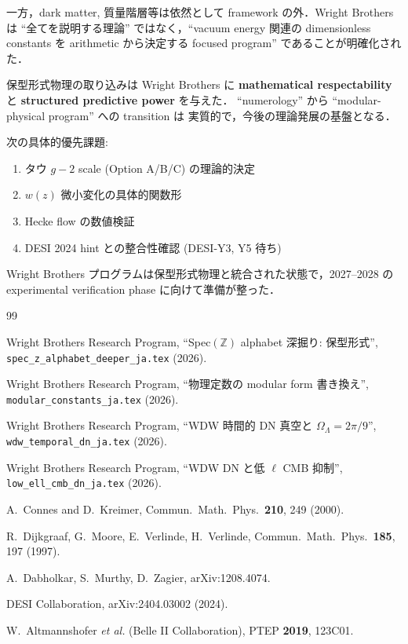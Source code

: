 \documentclass[11pt,a4paper]{article}
\begin{document}
一方，dark matter, 質量階層等は依然として framework の外．Wright
Brothers は ``全てを説明する理論'' ではなく，``vacuum energy 関連の
dimensionless constants を arithmetic から決定する focused program''
であることが明確化された．

保型形式物理の取り込みは Wright Brothers に \textbf{mathematical
respectability} と \textbf{structured predictive power} を与えた．
``numerology'' から ``modular-physical program'' への transition は
実質的で，今後の理論発展の基盤となる．

次の具体的優先課題:
\begin{enumerate}
\item タウ $g-2$ scale (Option A/B/C) の理論的決定
\item $w(z)$ 微小変化の具体的関数形
\item Hecke flow の数値検証
\item DESI 2024 hint との整合性確認 (DESI-Y3, Y5 待ち)
\end{enumerate}

Wright Brothers プログラムは保型形式物理と統合された状態で，2027--2028
の experimental verification phase に向けて準備が整った．

\begin{thebibliography}{99}

Wright Brothers Research Program,
``Spec$(\mathbb{Z})$ alphabet 深掘り: 保型形式'',
\texttt{spec\_z\_alphabet\_deeper\_ja.tex} (2026).

Wright Brothers Research Program,
``物理定数の modular form 書き換え'',
\texttt{modular\_constants\_ja.tex} (2026).

Wright Brothers Research Program,
``WDW 時間的 DN 真空と $\Omega_\Lambda = 2\pi/9$'',
\texttt{wdw\_temporal\_dn\_ja.tex} (2026).

Wright Brothers Research Program,
``WDW DN と低 $\ell$ CMB 抑制'',
\texttt{low\_ell\_cmb\_dn\_ja.tex} (2026).

A.~Connes and D.~Kreimer,
Commun.\ Math.\ Phys.\ \textbf{210}, 249 (2000).

R.~Dijkgraaf, G.~Moore, E.~Verlinde, H.~Verlinde,
Commun.\ Math.\ Phys.\ \textbf{185}, 197 (1997).

A.~Dabholkar, S.~Murthy, D.~Zagier, arXiv:1208.4074.

DESI Collaboration, arXiv:2404.03002 (2024).

W.~Altmannshofer \textit{et al.} (Belle II Collaboration),
PTEP \textbf{2019}, 123C01.

\end{thebibliography}
\end{document}
